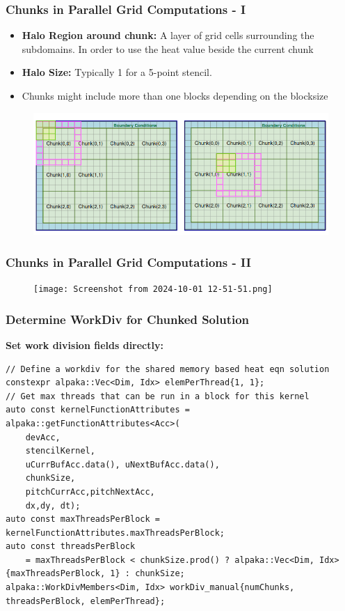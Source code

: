 \documentclass[9pt]{beamer}
\begin{document}
\begin{frame}
\frametitle{Chunks in Parallel Grid Computations - I}
\begin{itemize}
    \item \textbf{Halo Region around chunk:} A layer of grid cells surrounding the subdomains. In order to use the heat value beside the current chunk
    \item \textbf{Halo Size:} Typically 1 for a 5-point stencil.
    \item Chunks might include more than one blocks depending on the blocksize
\end{itemize}

\begin{figure}
    \centering
    \includegraphics[width=0.8\linewidth]{Screenshot from 2024-08-30 19-03-50.png}
    \label{fig:enter-label}
\end{figure}
\end{frame}




\begin{frame}
\frametitle{Chunks in Parallel Grid Computations - II}
\begin{figure}
    \centering
    \texttt{[image: Screenshot from 2024-10-01 12-51-51.png]}
    \label{fig:enter-label}
\end{figure}
\end{frame}

\begin{frame}[fragile]
\frametitle{Determine WorkDiv for Chunked Solution}

\textbf{Set work division fields directly:}
\lstset{basicstyle=\ttfamily\scriptsize}
\begin{lstlisting}
// Define a workdiv for the shared memory based heat eqn solution
constexpr alpaka::Vec<Dim, Idx> elemPerThread{1, 1};
// Get max threads that can be run in a block for this kernel
auto const kernelFunctionAttributes = alpaka::getFunctionAttributes<Acc>(
    devAcc,
    stencilKernel,
    uCurrBufAcc.data(), uNextBufAcc.data(),
    chunkSize,
    pitchCurrAcc,pitchNextAcc,
    dx,dy, dt);
auto const maxThreadsPerBlock = kernelFunctionAttributes.maxThreadsPerBlock;
auto const threadsPerBlock
    = maxThreadsPerBlock < chunkSize.prod() ? alpaka::Vec<Dim, Idx>{maxThreadsPerBlock, 1} : chunkSize;
alpaka::WorkDivMembers<Dim, Idx> workDiv_manual{numChunks, threadsPerBlock, elemPerThread};
\end{lstlisting}
\end{frame}
\end{document}
